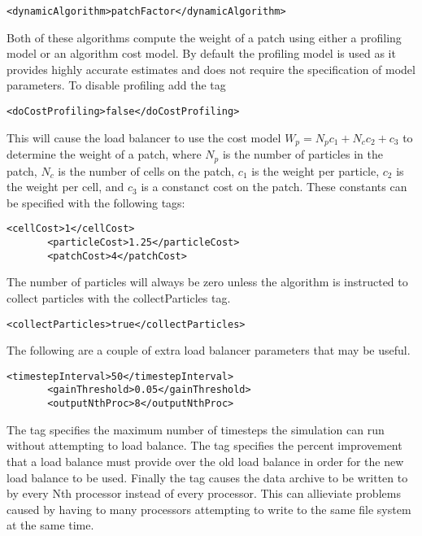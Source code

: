 \begin{Verbatim}[fontsize=\footnotesize]
       <dynamicAlgorithm>patchFactor</dynamicAlgorithm>
\end{Verbatim}

Both of these algorithms compute the weight of a patch using either a profiling model 
or an algorithm cost model.  By default  the profiling model is used as it provides 
highly accurate estimates and does not require the specification of model parameters.  
To disable profiling add the tag

\begin{Verbatim}[fontsize=\footnotesize]
       <doCostProfiling>false</doCostProfiling>
\end{Verbatim}

This will cause the load balancer to use the cost model $W_p=N_pc_1+N_cc_2+c_3$ to 
determine the weight of a patch, where $N_p$ is the number of particles 
in the patch, $N_c$ is the number of cells on the patch, $c_1$ is the weight per
particle, $c_2$ is the weight per cell, and $c_3$ is a constanct cost on the
patch.  These constants can be specified with the following tags:

\begin{Verbatim}[fontsize=\footnotesize]
       <cellCost>1</cellCost>
       <particleCost>1.25</particleCost>
       <patchCost>4</patchCost>
\end{Verbatim}

The number of particles will always be zero unless the algorithm is instructed to
collect particles with the collectParticles tag.  

\begin{Verbatim}[fontsize=\footnotesize]
       <collectParticles>true</collectParticles>
\end{Verbatim}

The following are a couple of extra load balancer parameters that may be useful.
\begin{Verbatim}[fontsize=\footnotesize]
       <timestepInterval>50</timestepInterval>
       <gainThreshold>0.05</gainThreshold>
       <outputNthProc>8</outputNthProc>
\end{Verbatim}

The  tag specifies the maximum number of timesteps the simulation
can run without attempting to load balance.  The  tag specifies the 
percent improvement that a load balance must provide over the old load balance in 
order for the new load balance to be used.  Finally the  tag causes
the data archive to be written to by every Nth processor instead of every processor.  
This can allieviate problems caused by having to many processors attempting to write 
to the same file system at the same time. 

